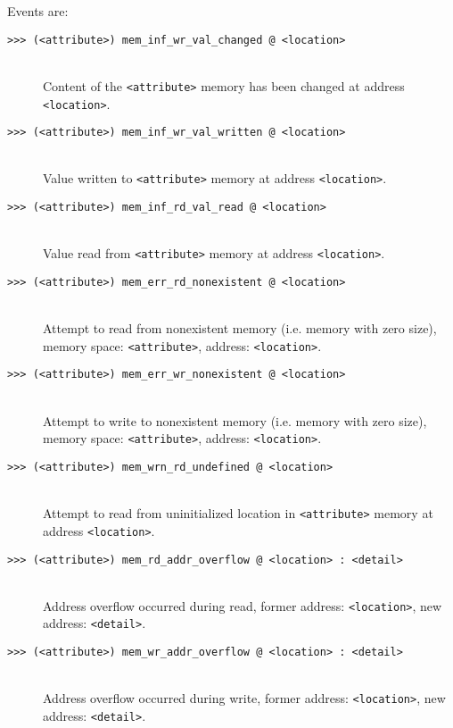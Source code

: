 \begin{description}
                Events are:
                \begin{description}
                    \item[\texttt{>{}>{}> (<attribute>) mem\_inf\_wr\_val\_changed @ <location>}]~\\
                        Content of the \texttt{<attribute>} memory has been changed at address \texttt{<location>}.
                    \item[\texttt{>{}>{}> (<attribute>) mem\_inf\_wr\_val\_written @ <location>}]~\\
                        Value written to \texttt{<attribute>} memory at address \texttt{<location>}.
                    \item[\texttt{>{}>{}> (<attribute>) mem\_inf\_rd\_val\_read @ <location>}]~\\
                        Value read from \texttt{<attribute>} memory at address \texttt{<location>}.
                    \item[\texttt{>{}>{}> (<attribute>) mem\_err\_rd\_nonexistent @ <location>}]~\\
                        Attempt to read from nonexistent memory (i.e. memory with zero size), memory space: \texttt{<attribute>}, address: \texttt{<location>}.
                    \item[\texttt{>{}>{}> (<attribute>) mem\_err\_wr\_nonexistent @ <location>}]~\\
                        Attempt to write to nonexistent memory (i.e. memory with zero size), memory space: \texttt{<attribute>}, address: \texttt{<location>}.
                    \item[\texttt{>{}>{}> (<attribute>) mem\_wrn\_rd\_undefined @ <location>}]~\\
                        Attempt to read from uninitialized location in \texttt{<attribute>} memory at address \texttt{<location>}.
                    \item[\texttt{>{}>{}> (<attribute>) mem\_rd\_addr\_overflow @ <location> : <detail>}]~\\
                        Address overflow occurred during read, former address: \texttt{<location>}, new address: \texttt{<detail>}.
                    \item[\texttt{>{}>{}> (<attribute>) mem\_wr\_addr\_overflow @ <location> : <detail>}]~\\
                        Address overflow occurred during write, former address: \texttt{<location>}, new address: \texttt{<detail>}.

\end{description}
\end{description}
